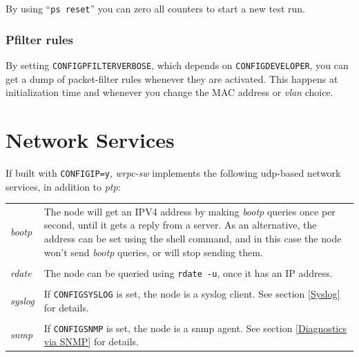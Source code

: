 \documentclass[a4paper, 12pt]{article}
\renewcommand{\_}{\underscore\allowbreak}
\begin{document}
By using ``\texttt{ps reset}'' you can zero all counters to start a new
test run.

\subsubsection{Pfilter rules}
\label{Pfilter rules}

By setting \texttt{CONFIG\_PFILTER\_VERBOSE}, which depends on
\texttt{CONFIG\_DEVELOPER}, you can get a dump of packet-filter rules
whenever they are activated.  This happens at initialization time and
whenever you change the MAC address or \textit{vlan} choice.

\newpage
\section{Network Services}
\label{Network Services}

If built with \texttt{CONFIG\_IP=y}, \textit{wrpc-sw} implements the following
udp-based network services, in addition to \textit{ptp}:

\begin{longtable}{  p{6.5cm}  p{9cm} }

\textit{ bootp } &

	The node will get an IPV4 address by making \textit{bootp} queries
        once per second, until it gets a reply from a server. As an
        alternative, the address can be set using the shell command,
        and in this case the node won't send \textit{bootp} queries, or will
        stop sending them.\\
& \\
\textit{ rdate } &

	The node can be queried using \texttt{rdate -u}, once it has an IP
        address.\\
& \\
\textit{ syslog } &

	If \texttt{CONFIG\_SYSLOG} is set, the node is a syslog client.
        See section \ref{Syslog} for details.\\
& \\
\textit{ snmp } &

	If \texttt{CONFIG\_SNMP} is set, the node is a snmp agent.
        See section \ref{Diagnostics via SNMP} for details.\\

\end{longtable}
\end{document}
